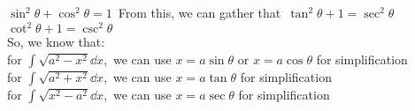 $\sin^2\theta + \cos^2\theta = 1$\
From this, we can gather that\
$\tan^2\theta + 1 = \sec^2\theta$\
$\cot^2\theta + 1 = \csc^2\theta$\\
So, we know that:\\
for $\int\sqrt{a^2 - x^2} \dd x$,\
we can use $x =  a\sin \theta$ or $x =  a\cos \theta$ for simplification\\
for $\int\sqrt{a^2 + x^2} \dd x$,\
we can use $x =  a\tan \theta$ for simplification\\
for $\int\sqrt{x^2 - a^2} \dd x$,\
we can use $x = a \sec \theta$ for simplification 
